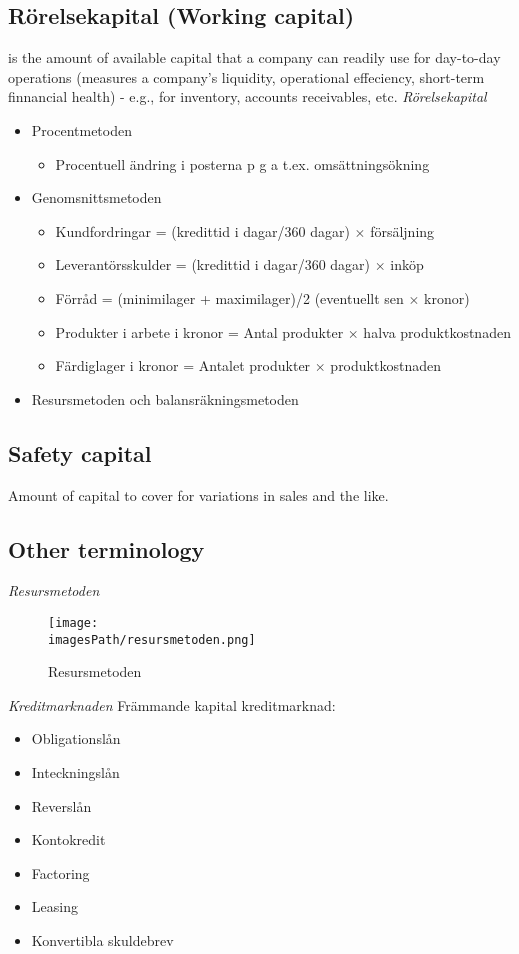 \subsection{Rörelsekapital (Working capital)}
is the amount of available capital that a company can readily use for 
day-to-day operations (measures a company's liquidity, operational effeciency,
short-term finnancial health) - e.g., for inventory, accounts receivables, etc.
\textit{Rörelsekapital}
\begin{itemize}
    \item Procentmetoden
    \begin{itemize}
        \item Procentuell ändring i posterna p g a t.ex. omsättningsökning
    \end{itemize}
    \item Genomsnittsmetoden
    \begin{itemize}
        \item Kundfordringar = (kredittid i dagar/360 dagar) $\times$ försäljning
        \item Leverantörsskulder = (kredittid i dagar/360 dagar) $\times$ inköp
        \item Förråd = (minimilager + maximilager)/2 (eventuellt sen $\times$ kronor)
        \item Produkter i arbete i kronor = Antal produkter $\times$ halva produktkostnaden
        \item Färdiglager i kronor = Antalet produkter $\times$ produktkostnaden
    \end{itemize}
    \item Resursmetoden och balansräkningsmetoden 
\end{itemize}

\subsection{Safety capital}
Amount of capital to cover for variations in sales and the like.

\subsection{Other terminology}
\textit{Resursmetoden}
\begin{figure}[!h]
    \centering
    \texttt{[image: \\imagesPath/resursmetoden.png]}
    \caption{Resursmetoden}
\end{figure}

\textit{Kreditmarknaden} \newline
Främmande kapital kreditmarknad:
\begin{itemize}
    \item Obligationslån
    \item Inteckningslån 
    \item Reverslån 
    \item Kontokredit 
    \item Factoring
    \item Leasing 
    \item Konvertibla skuldebrev
\end{itemize}

